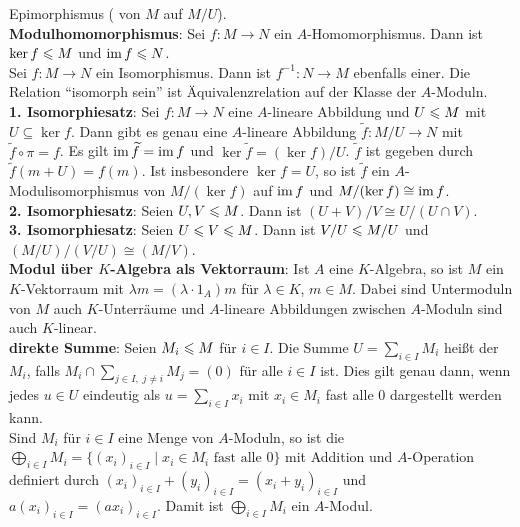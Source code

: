 \begin{Bem}
    Epimorphismus ( von $M$ auf $M/U$). \\
    \textbf{Modulhomomorphismus}:
    Sei $f: M \rightarrow N$ ein $A$-Homomorphismus.
    Dann ist $\ker f \leqslant M$ und $\operatorname{im} f \leqslant N$. \\
    Sei $f: M \rightarrow N$ ein Isomorphismus.
    Dann ist $f^{-1}: N \rightarrow M$ ebenfalls einer.
    Die Relation "`isomorph sein"' ist Äquivalenzrelation auf der Klasse
    der $A$-Moduln. \\
    \textbf{1. Isomorphiesatz}:
    Sei $f: M \rightarrow N$ eine $A$-lineare Abbildung und $U \leqslant M$ mit
    $U \subseteq \ker f$.
    Dann gibt es genau eine $A$-lineare Abbildung
    $\widetilde{f}: M/U \rightarrow N$ mit $\widetilde{f} \circ \pi = f$.
    Es gilt $\operatorname{im} \widetilde{f} = \operatorname{im} f$ und
    $\ker \widetilde{f} = (\ker f)/U$.
    $\widetilde{f}$ ist gegeben durch $\widetilde{f}(m + U) = f(m)$.
    Ist insbesondere $\ker f = U$, so ist $\widetilde{f}$ ein
    $A$-Modulisomorphismus von $M/(\ker f)$ auf $\operatorname{im} f$ und
    $M/(\ker f) \cong \operatorname{im} f$. \\
    \textbf{2. Isomorphiesatz}:
    Seien $U, V \leqslant M$.
    Dann ist $(U + V)/V \cong U/(U \cap V)$. \\
    \textbf{3. Isomorphiesatz}:
    Seien $U \leqslant V \leqslant M$.
    Dann ist $V/U \leqslant M/U$ und $(M/U)/(V/U) \cong (M/V)$. \\
    \textbf{Modul über $K$-Algebra als Vektorraum}:
    Ist $A$ eine $K$-Algebra, so ist $M$ ein $K$-Vektorraum mit
    $\lambda m = (\lambda \cdot 1_A) m$ für $\lambda \in K$, $m \in M$.
    Dabei sind Untermoduln von $M$ auch $K$-Unterräume und $A$-lineare
    Abbildungen zwischen $A$-Moduln sind auch $K$-linear. \\
    \textbf{direkte Summe}:
    Seien $M_i \leqslant M$ für $i \in I$.
    Die Summe $U = \sum_{i \in I} M_i$ heißt
     der $M_i$, falls
    $M_i \cap \sum_{j \in I,\; j \not= i} M_j = (0)$ für alle $i \in I$ ist.
    Dies gilt genau dann, wenn jedes $u \in U$ eindeutig
    als $u = \sum_{i \in I} x_i$ mit $x_i \in M_i$ fast alle $0$ dargestellt
    werden kann. \\
    Sind $M_i$ für $i \in I$ eine Menge von $A$-Moduln,
    so ist die  \\
    $\bigoplus_{i \in I} M_i = \{(x_i)_{i \in I} \;|\; x_i \in M_i
    \text{ fast alle } 0\}$
    mit Addition und $A$-Operation definiert durch
    $(x_i)_{i \in I} + (y_i)_{i \in I} = (x_i + y_i)_{i \in I}$ und
    $a (x_i)_{i \in I} = (ax_i)_{i \in I}$.
    Damit ist $\bigoplus_{i \in I} M_i$ ein $A$-Modul.
\end{Bem}

